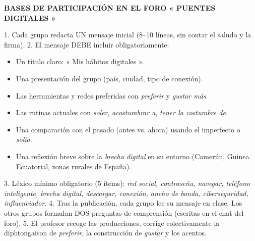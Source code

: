 \documentclass[11pt]{article}
\begin{document}
\begin{textebox}
\textbf{BASES DE PARTICIPACIÓN EN EL FORO « PUENTES DIGITALES »}

1. Cada grupo redacta UN mensaje inicial (8--10 líneas, sin contar el saludo y la firma).
2. El mensaje DEBE incluir obligatoriamente:
   \begin{itemize}
       \item[a)] Un título claro: « Mis hábitos digitales ».
       \item[b)] Una presentación del grupo (país, ciudad, tipo de conexión).
       \item[c)] Las herramientas y redes preferidas con \emph{preferir} y \emph{gustar más}.
       \item[d)] Las rutinas actuales con \emph{soler}, \emph{acostumbrar a}, \emph{tener la costumbre de}.
       \item[e)] Una comparación con el pasado (antes vs. ahora) usando el imperfecto o \emph{solía}.
       \item[f)] Una reflexión breve sobre la \emph{brecha digital} en su entorno (Camerún, Guinea Ecuatorial, zonas rurales de España).
   \end{itemize}
3. Léxico mínimo obligatorio (5 ítems): \emph{red social, contraseña, navegar, teléfono inteligente, brecha digital, descargar, conexión, ancho de banda, ciberseguridad, influenciador}.
4. Tras la publicación, cada grupo lee su mensaje en clase. Los otros grupos formulan DOS preguntas de comprensión (escritas en el chat del foro).
5. El profesor recoge las producciones, corrige colectivamente la diphtongaison de \emph{preferir}, la construcción de \emph{gustar} y los acentos.
\end{textebox}
\end{document}
